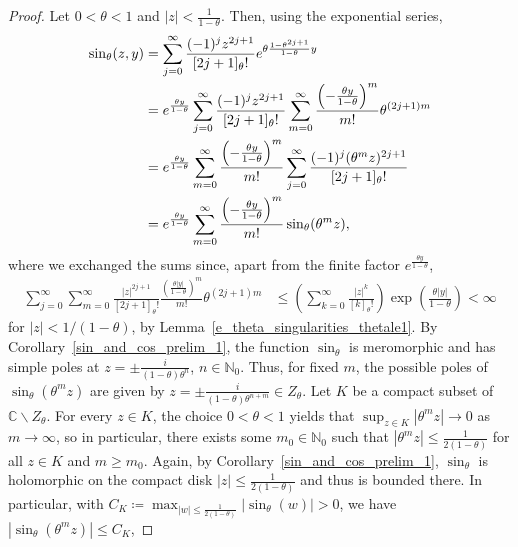 \documentclass[12pt]{article}
\newcommand{\N}{\mathbb{N}} %
\newcommand{\C}{\mathbb{C}} %
\newcommand{\1}{\mathds{1}}
\theoremstyle{definition}
\theoremstyle{plain}
\theoremstyle{remark}
\begin{document}
 \begin{proof}
Let $0<\theta<1$ and $|z|<\frac{1}{1-\theta}$. 
Then, using the exponential series,
\begin{align}\label{eq_for_proof_sin_zy}
    \sin_\theta(z,y)
    &= \sum_{j=0}^\infty\frac{(-1)^{j}z^{2j+1}}{[2j+1]_{\theta}!}e^{\theta\frac{1-\theta^{2j+1}}{1-\theta} y}\notag
    \\&=e^{\frac{\theta y}{1-\theta}}\sum_{j=0}^\infty\frac{(-1)^{j}z^{2j+1}}{[2j+1]_{\theta}!}\sum_{m=0}^\infty\frac{\left(-\frac{ \theta y}{1-\theta}\right)^m}{m!}\theta^{(2j+1)m}\notag
    \\&=e^{\frac{\theta y}{1-\theta}}\sum_{m=0}^\infty\frac{\left(-\frac{\theta y}{1-\theta}\right)^m}{m!}\sum_{j=0}^\infty\frac{(-1)^{j}(\theta^m z)^{2j+1}}{[2j+1]_{\theta}!}\notag
    \\&=e^{\frac{\theta y}{1-\theta}}\sum_{m=0}^\infty\frac{\left(-\frac{\theta y}{1-\theta}\right)^m}{m!}\sin_\theta(\theta^m z),
\end{align}
where we exchanged the sums since, apart from the
finite factor $e^{\frac{\theta y}{1-\theta}}$,
\begin{align*}
    \sum_{j=0}^\infty\sum_{m=0}^\infty
    \frac{|z|^{2j+1}}{[2j+1]_\theta!}
    \frac{\left(\frac{\theta|y|}{1-\theta}\right)^m}{m!}
    \theta^{(2j+1)m}
    &\leq \left(\sum_{k=0}^\infty \frac{|z|^{k}}{[k]_\theta!}\right)\exp\left(\frac{\theta|y|}{1-\theta}\right)
    <\infty
\end{align*}
for $|z|<1/(1-\theta)$, by Lemma~\ref{e_theta_singularities_thetale1}.
By Corollary~\ref{sin_and_cos_prelim_1}, the function $\sin_\theta$ is meromorphic and has simple poles at  $z=\pm\frac{i}{(1-\theta)\theta^n}$, $n\in\N_0$. Thus, for fixed $m$, the possible poles of $\sin_\theta(\theta^m z)$ are given by $z=\pm\frac{i}{(1-\theta)\theta^{n+m}}\in Z_\theta$. Let $K$ be a compact subset of $\C\backslash Z_\theta$. For every $z\in K$, the choice $0<\theta<1$ yields that $\sup_{z\in K}|\theta^mz|\to 0$ as $m\to\infty$, so in particular, there exists some $m_0\in\N_0$ such that
$|\theta^m z|\le\frac{1}{2(1-\theta)}$ for all $z\in K$ and $m\ge m_0$. Again, by Corollary~\ref{sin_and_cos_prelim_1}, $\sin_\theta$ is holomorphic on the compact disk $|z|\le\frac{1}{2(1-\theta)}$ and thus is bounded there. In particular, with $C_K\coloneqq \max_{|w|\le\frac{1}{2(1-\theta)}}|\sin_\theta(w)|>0$, we have
   $|\sin_\theta(\theta^m z)|\le C_K$,

\end{proof}
\end{document}
